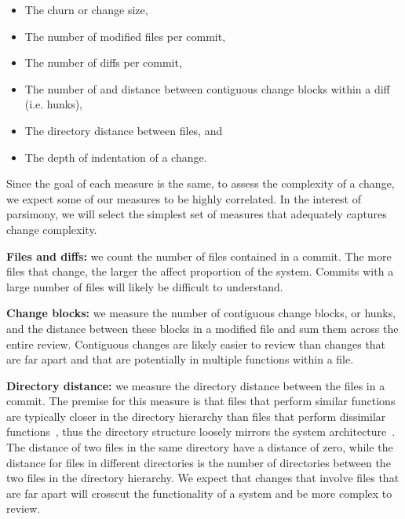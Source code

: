 \documentclass[11pt,twocolumn,a4paper]{article}
\newcommand*{\ie}{i.e. }
\begin{document}
\begin{itemize}

\item The churn or change size, 

\item The number of modified files per commit,

\item The number of diffs per commit, 

\item The number of and distance between contiguous change blocks within a diff
(\ie hunks), 

\item The directory distance between files, and 

\item The depth of indentation of a change. 

\end{itemize}

%
Since the goal of each measure is the same, to assess the complexity of a
change, we expect some of our measures to be highly correlated. 
In the interest of parsimony, we will select the simplest set of measures that adequately captures change complexity. 

{\bf Files and diffs:} we count the number of files contained in a commit. The more files that change, the larger the affect proportion of the system. Commits with a large number of files will likely be difficult to understand. 

{\bf Change blocks:} we measure the number of contiguous change blocks, or
hunks, and the distance between these blocks in a modified file and sum them
across the entire review.  Contiguous changes  are likely easier to review than
changes that are far apart and that are potentially in multiple functions
within a file.  

{\bf Directory distance:} we measure the directory distance between the files
in a commit. The premise for this measure is that files that perform similar
functions are typically closer in the directory hierarchy than files that
perform dissimilar functions~\cite{Bowman1999ICSE}, thus the directory
structure loosely mirrors the system architecture~\cite{RigbySubTOSEM}. The
distance of two files in the same directory have a distance of zero, while the
distance for files in different directories is the number of directories
between the two files in the directory hierarchy.  We expect that changes that
involve files that are far apart will crosscut the functionality of a system
and be more complex to review.
\end{document}
